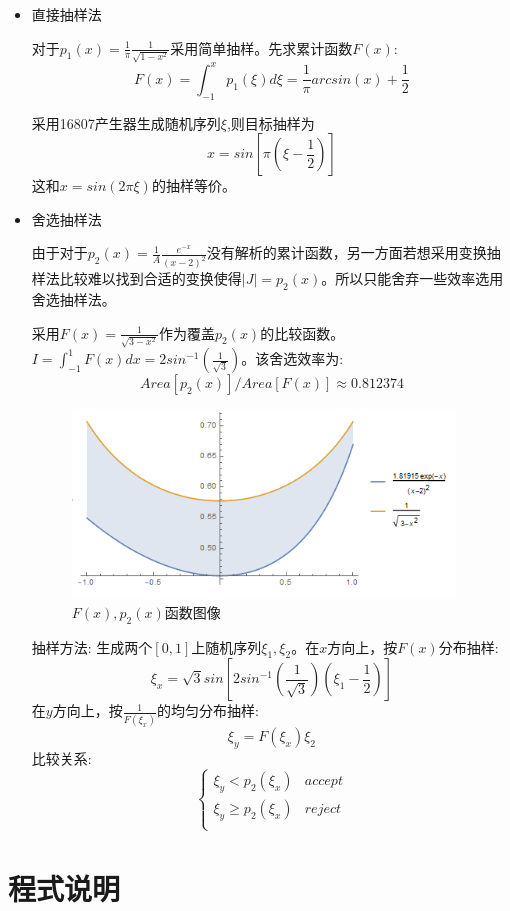 \documentclass[UTF8]{ctexart}
\begin{document}
	\begin{itemize}
		
		\item 直接抽样法
		
		对于$p_1(x)=\frac{1}{\pi}\frac{1}{\sqrt{1-x^2}}$采用简单抽样。先求累计函数$F(x)$:
		$$F(x)=\int_{-1}^{x}p_1(\xi)d\xi=\frac{1}{\pi}arcsin(x)+\frac12$$
		
		采用16807产生器生成随机序列$\xi$,则目标抽样为
		$$x=sin[\pi(\xi-\frac{1}{2})]$$
		这和$x=sin(2\pi\xi)$的抽样等价。
		
		\item 舍选抽样法
		
		由于对于$p_2(x)=\frac{1}{A}\frac{e^{-x}}{{(x-2)}^2}$没有解析的累计函数，另一方面若想采用变换抽样法比较难以找到合适的变换使得$|J|=p_2(x)$。所以只能舍弃一些效率选用舍选抽样法。
		
		采用$F(x)=\frac{1}{\sqrt{3-x^2}}$作为覆盖$p_2(x)$的比较函数。$I=\int_{-1}^{1}F(x)dx=2sin^{-1}(\frac{1}{\sqrt{3}})$。该舍选效率为:
		$$Area[p_2(x)]/Area[F(x)]\approx0.812374$$
		
			\begin{figure}[H]
			\centering  %
			
				\includegraphics[width=4in]{F.png}
			\caption{$F(x),p_2(x)$函数图像}
			\label{N}
		\end{figure}
	抽样方法:
	生成两个$[0,1]$上随机序列$\xi_1
	,\xi_2$。在$x$方向上，按$F(x)$分布抽样:$$\xi_x=\sqrt{3}sin[2sin^{-1}(\frac{1}{\sqrt{3}})(\xi_1-\frac{1}{2 })]$$
	在$y$方向上，按$\frac{1}{F(\xi_x)}$的均匀分布抽样:$$\xi_y=F(\xi_x)\xi_2$$
	比较关系:
		$$\left\{
		\begin{array}{lc}
		\xi_y<p_2(\xi_x)& accept\\
		\xi_y\geq p_2(\xi_x)& reject\\
		\end{array}
		\right.
		$$
	\end{itemize}
	\section{程式说明}
	
\end{document}
